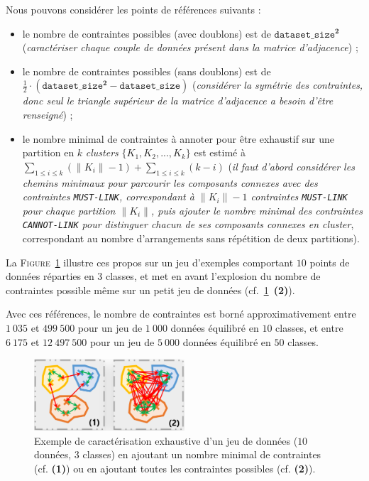 			\begin{leftBarAuthorOpinion}
				Nous pouvons considérer les points de références suivants :
				\begin{itemize}
					\item le nombre de contraintes possibles (avec doublons) est de $\texttt{dataset\_size}^{\textbf{2}}$ (\textit{caractériser chaque couple de données présent dans la matrice d'adjacence}) ;
					\item le nombre de contraintes possibles (sans doublons) est de $\frac{1}{2} \cdot (\texttt{dataset\_size}^{\textbf{2}} - \texttt{dataset\_size})$ (\textit{considérer la symétrie des contraintes, donc seul le triangle supérieur de la matrice d'adjacence a besoin d'être renseigné}) ;
					\item le nombre minimal de contraintes à annoter pour être exhaustif sur une partition en $k$ \textit{clusters} $\{K_{1}, K_{2}, ..., K_{k}\} $ est estimé à ${\displaystyle \sum\limits_{1 \leq i \leq k}{(\|K_{i}\|-1)} + \sum\limits_{1 \leq i \leq k}{(k-i)}} $
					(\textit{il faut d'abord considérer les chemins minimaux pour parcourir les composants connexes avec des contraintes \texttt{MUST-LINK}, correspondant à $\|K_{i}\|-1$ contraintes \texttt{MUST-LINK} pour chaque partition $\|K_{i}\|$, puis ajouter le nombre minimal des contraintes \texttt{CANNOT-LINK} pour distinguer chacun de ses composants connexes en \textit{cluster}}, correspondant au nombre d'arrangements sans répétition de deux partitions).
				\end{itemize}
				La \textsc{Figure~\ref{figure:4.3.3-ETUDE-COUT-NOMBRE-CONTRAINTES-EXEMPLES}} illustre ces propos sur un jeu d'exemples comportant $10$ points de données réparties en $3$ classes, et met en avant l'explosion du nombre de contraintes possible même sur un petit jeu de données (cf.~\ref{figure:4.3.3-ETUDE-COUT-NOMBRE-CONTRAINTES-EXEMPLES}~\textbf{(2)}).
				
				Avec ces références, le nombre de contraintes est borné approximativement
				entre $1~035$ et $499~500$ pour un jeu de $1~000$ données équilibré en $10$ classes,
				et entre $6~175$ et $12~497~500$ pour un jeu de $5~000$ données équilibré en $50$ classes.
				\begin{figure}[H]
					\centering
					\includegraphics[width=0.5\textwidth]{figures/etude-nombre-contraintes-2-bornes-limites}
					\caption{
						Exemple de caractérisation exhaustive d'un jeu de données ($10$ données, $3$ classes) en ajoutant un nombre minimal de contraintes (cf. \textbf{(1)}) ou en ajoutant toutes les contraintes possibles (cf. \textbf{(2)}).
					}
					\label{figure:4.3.3-ETUDE-COUT-NOMBRE-CONTRAINTES-EXEMPLES}
				\end{figure}
			\end{leftBarAuthorOpinion}

